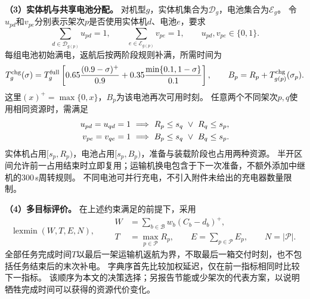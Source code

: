 \textbf{（3）实体机与共享电池分配。}
对机型$g$，实体机集合为$\mathcal D_g$，电池集合为$\mathcal E_g$。
令$u_{pd}$和$v_{pe}$分别表示架次$p$是否使用实体机$d$、电池$e$，要求
\begin{equation}
 \sum_{d\in\mathcal D_{g(p)}}u_{pd}=1,\qquad
 \sum_{e\in\mathcal E_{g(p)}}v_{pe}=1,\qquad u_{pd},v_{pe}\in\{0,1\}.
 \label{eq:q2:entity}
\end{equation}
每组电池初始满电，返航后按两阶段规则补满，所需时间为
\begin{equation}
 T_g^{\rm chg}(\sigma)=T_g^{\rm full}
 \left[0.65\frac{(0.9-\sigma)^+}{0.9}
       +0.35\frac{\min\{0.1,1-\sigma\}}{0.1}\right],\qquad
 B_p=R_p+T_{g(p)}^{\rm chg}(\sigma_p).
 \label{eq:q2:charging}
\end{equation}
这里$(x)^+=\max\{0,x\}$，$B_p$为该电池再次可用时刻。
任意两个不同架次$p,q$使用相同资源时，需满足
\begin{align}
 u_{pd}=u_{qd}=1&\ \Longrightarrow\ R_p\le s_q\ \lor\ R_q\le s_p,\notag\\
 v_{pe}=v_{qe}=1&\ \Longrightarrow\ B_p\le s_q\ \lor\ B_q\le s_p.
 \label{eq:q2:nonoverlap}
\end{align}
实体机占用$[s_p,R_p)$，电池占用$[s_p,B_p)$，准备与装载阶段也占用两种资源。
半开区间允许前一占用结束时立即复用；运输机换电包含于下一次准备，不额外添加中继机的300\,s周转规则。
不同电池可并行充电，不引入附件未给出的充电器数量限制。

\textbf{（4）多目标评价。}
在上述约束满足的前提下，采用
\begin{equation}
 \operatorname{lexmin}(W,T,E,N),\qquad
 \begin{aligned}
  W&=\sum_{b\in\mathcal B}w_b(C_b-d_b)^+,\\
  T&=\max_{p\in\mathcal P}R_p,\qquad
  E=\sum_{p\in\mathcal P}E_p,\qquad N=|\mathcal P|.
 \end{aligned}
 \label{eq:q2:objective}
\end{equation}
全部任务完成时间$T$以最后一架运输机返航为界，不取最后一箱交付时刻，也不包括任务结束后的末次补电。
字典序首先比较加权延迟，仅在前一指标相同时比较下一指标。
该顺序为本文的决策选择；另报告节能或少架次的代表方案，以说明牺牲完成时间可以获得的资源代价变化。
